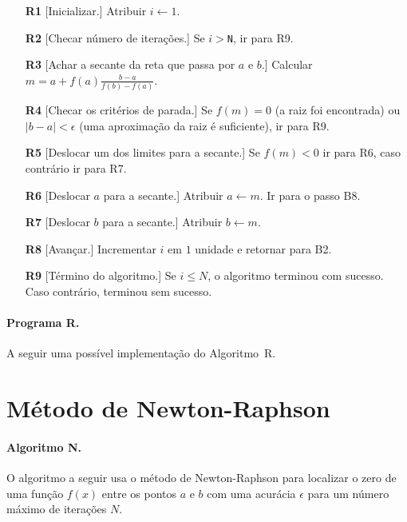  \begin{itemize}

	 \item[\bf R1] [Inicializar.] Atribuir $i \leftarrow 1$.


	 \item[\bf R2] [Checar número de iterações.] Se $i>${\tt N}, 
 		ir para R9.

	\item[\bf R3] [Achar a secante da reta que passa por $a$ e $b$.] 
		Calcular \\\hbox{$m = a+ f(a)\frac{b-a}{f(b)-f(a)}$}.

	\item[\bf R4] [Checar os critérios de parada.] Se $f(m)=0$
		(a raiz foi encontrada)
		ou \hbox{$|b-a| < \epsilon$} (uma aproximação da
		raiz é suficiente), ir para R9.

	\item[\bf R5] [Deslocar um dos limites para a secante.]
		Se $f(m)<0$ ir para R6, caso contrário 
		ir para R7.

	\item[\bf R6] [Deslocar $a$ para a secante.] Atribuir
		$a\leftarrow m$. Ir para o passo B8.

	\item[\bf R7] [Deslocar $b$ para a secante.] Atribuir
		$b\leftarrow m$.
 
	\item[\bf R8] [Avançar.] Incrementar $i$ em $1$ unidade e
		retornar para B2.
 
	\item[\bf R9] [Término do algoritmo.] Se $i\leq N$, o algoritmo
 		terminou com sucesso. Caso contrário, terminou 
	 	sem sucesso.\quad\pfbox
 \end{itemize}

 \pagebreak
 \paragraph{Programa R.} A seguir uma possível implementação 
do Algoritmo~R.
 
 
 
 \pagebreak
\section{Método de Newton-Raphson}

\paragraph{Algoritmo N.}
O algoritmo a seguir usa 
o método de Newton-Raphson
para localizar o zero de uma função $f(x)$ 
entre os pontos $a$ e $b$
com uma acurácia $\epsilon$ para um número máximo 
de iterações $N$. 

